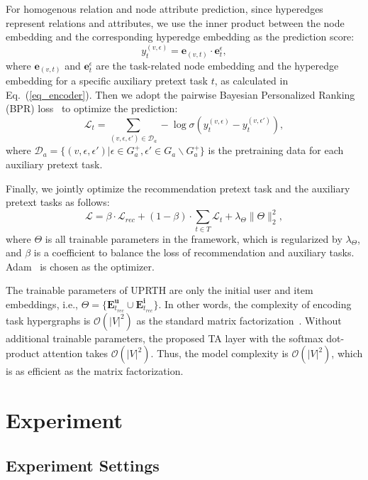 For homogenous relation and node attribute prediction, since hyperedges represent relations and attributes, we use the inner product between the node embedding and the corresponding hyperedge embedding as the prediction score:
\begin{equation}
{y}^{(v,\epsilon)}_{t} = \mathbf{e}_{(v,t)}\cdot \mathbf{e}^{\epsilon}_{t},
\end{equation}
where $\mathbf{e}_{(v,t)}$ and $\mathbf{e}^{\epsilon}_{t}$ are the task-related node embedding and the hyperedge embedding for a specific auxiliary pretext task $t$, as calculated in Eq.~(\ref{eq_encoder}).
Then we adopt the pairwise Bayesian Personalized Ranking (BPR) loss~\cite{BPR} to optimize the prediction:
\begin{equation}
\mathcal{L}_{t}=\sum\limits_{(v,\epsilon,\epsilon')\in \mathcal{D}_a} -\log\sigma({y}^{(v,\epsilon)}_{t}-{y}^{(v,\epsilon')}_{t}),
\end{equation}
where $\mathcal{D}_a=\{(v,\epsilon,\epsilon')|\epsilon\in G^{+}_{a}, \epsilon'\in G_{a}\backslash G^{+}_{a}\}$ is the pretraining data for each auxiliary pretext task. 

Finally, we jointly optimize the recommendation pretext task and the auxiliary pretext tasks as follows:
\begin{equation}
\mathcal{L}= \beta\cdot\mathcal{L}_{rec} + (1-\beta)\cdot\sum\limits_{t\in T}\mathcal{L}_{t} + \lambda_\Theta\|\Theta\|^2_2,
\end{equation}
where $\Theta$ is all trainable parameters in the framework, which is regularized by $\lambda_\Theta$, and $\beta$ is a coefficient to balance the loss of recommendation and auxiliary tasks. 
Adam~\cite{Adam} is chosen as the optimizer.

The trainable parameters of UPRTH are only the initial user and item embeddings, i.e., $\Theta=\{\mathbf{E}^{\mathbf{u}}_{t_{rec}}\cup\mathbf{E}^{\mathbf{i}}_{t_{rec}}\}$. In other words, the complexity of encoding task hypergraphs is $\mathcal{O}(|V|^2)$ as the standard matrix factorization~\cite{LightGCN}. Without additional trainable parameters, the proposed TA layer with the softmax dot-product attention takes $\mathcal{O}(|V|^2)$. Thus, the model complexity is $\mathcal{O}(|V|^2)$, which is as efficient as the matrix factorization.

\section{Experiment}
\subsection{Experiment Settings}
